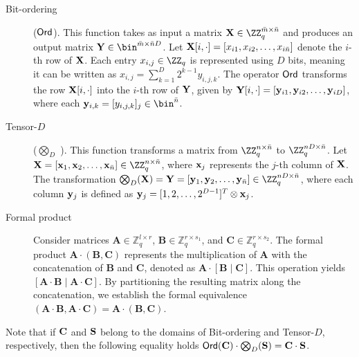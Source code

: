 \documentclass{fundam}
\begin{document}
\begin{description}
	
	\item[{Bit-ordering}] {($\mathsf{Ord}$)}. This function takes as input a matrix $\vr{X}\in \ZZ_{q}^{\bar{m}\times \bar{n}}$ and produces an output matrix  $\vr{Y}\in \bin^{\bar{m}\times \bar{n}D}$. Let $\mathbf{X}[i,\cdot]=[{x}_{i1}, {x}_{i2}, \ldots , {x}_{i\bar{n}}]$ denote the $i$-th row of $\mathbf{X}$. Each entry ${x}_{i,j}\in\ZZ_{q}$ is represented using $D$ bits, meaning it can be written as ${x}_{i,j}=\sum_{k=1}^{D}2^{k-1}y_{i,j,k}$. The operator $\mathsf{Ord}$ transforms the row $\mathbf{X}[i,\cdot]$ into the $i$-th row of $\mathbf{Y}$, given by $\mathbf{Y}[i,\cdot]=[\mathbf{y}_{i1}, \mathbf{y}_{i2}, \ldots , \mathbf{y}_{iD}]$, where each $\vr{y}_{i,k}=[y_{i,j,k}]_{j}\in\bin^{\bar{n}}$.
	
	\item[Tensor-$D$] ($\bigotimes_{D}$  ). This function transforms a matrix from $\ZZ_{q}^{n\times \bar{n}}$ to $\ZZ_{q}^{nD\times \bar{n}}$. Let $\vr{X} =[\vr{x}_{1}, \vr{x}_{2}, \ldots , \vr{x}_{\bar{n}}]\in \ZZ_{q}^{n\times \bar{n}}$, where $\mathbf{x}_{j}$ represents the $j$-th column of $\mathbf{X}$. The transformation $\bigotimes_{D}(\vr{X}) = \vr{Y}=[\vr{y}_{1}, \vr{y}_{2}, \ldots , \vr{y}_{\bar{n}}]\in \ZZ_{q}^{nD\times \bar{n}}$, where each column $\mathbf{y}_{j}$ is defined as $\mathbf{y}_{j}=[1, 2, \ldots , 2^{D-1}]^{T}\otimes \mathbf{x}_{j}$.
	
	\item[Formal product] Consider matrices $\mathbf{A} \in \mathbb{Z}_q^{l \times r}$, $\mathbf{B} \in \mathbb{Z}_q^{r \times s_1}$, and $\mathbf{C} \in \mathbb{Z}_q^{r \times s_2}$. The formal product $\mathbf{A} \cdot (\mathbf{B}, \mathbf{C})$ represents the multiplication of $\mathbf{A}$ with the concatenation of $\mathbf{B}$ and $\mathbf{C}$, denoted as $\mathbf{A} \cdot [\mathbf{B} \mid \mathbf{C}]$. This operation yields $[\mathbf{A} \cdot \mathbf{B} \mid \mathbf{A} \cdot \mathbf{C}]$. By partitioning the resulting matrix along the concatenation, we establish the formal equivalence $(\mathbf{A} \cdot \mathbf{B}, \mathbf{A} \cdot \mathbf{C}) = \mathbf{A} \cdot (\mathbf{B}, \mathbf{C})$.
\end{description}


\begin{remark}
Note that if $\mathbf{C}$ and $\mathbf{S}$ belong to the domains of Bit-ordering and Tensor-$D$, respectively, then the following equality holds
$\mathsf{Ord}(\mathbf{C})\cdot \bigotimes_{D} (\mathbf{S}) = \mathbf{C}\cdot \mathbf{S}$.
\end{remark}	
\end{document}
